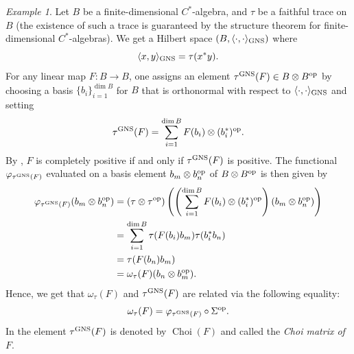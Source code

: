 \documentclass[11pt, a4paper, oneside, final, reqno]{amsart}
\newcommand{\Choi}{\operatorname{Choi}}
\theoremstyle{definition}
\theoremstyle{plain}
\theoremstyle{remark}
\newtheorem{example}[definition]{Example}
\numberwithin{equation}{section}
\begin{document}
\begin{example}\label{example:finite-dimensional Choi matrix}
    Let $B$ be a finite-dimensional $C^*$-algebra, and $\tau$ be a faithful trace on $B$ (the existence of such a trace is guaranteed by the structure theorem for finite-dimensional $C^*$-algebras). We get a Hilbert space $(B, \langle \cdot, \cdot \rangle_{\rm GNS})$ where
    \begin{equation*}
        \langle x, y \rangle_{\rm GNS} = \tau(x^*y).
    \end{equation*}
    For any linear
    map $F \colon B \to B$, one assigns an element $\tau^{\rm GNS}(F) \in B \otimes B^{\rm op}$ by choosing a basis $\{b_i\}_{i = 1}^{\dim B}$ for $B$ that is orthonormal with respect to $\langle \cdot, \cdot \rangle_{\rm GNS}$ and setting
    \begin{equation*}
        \tau^{\rm GNS}(F) = \sum_{i = 1}^{\dim B} F(b_i) \otimes (b_i^*)^{\rm op}.
    \end{equation*}
    By \cite[Proposition 3.7]{Wasilewski2024}, $F$ is completely positive if and only if $\tau^{\rm GNS}(F)$ is positive. The functional $\varphi_{\tau^{\rm GNS}(F)}$ evaluated on a basis element $b_m \otimes b_n^{\rm op}$ of $B \otimes B^{\rm op}$ is then given by
    \begin{align*}
        \varphi_{\tau^{\rm GNS}(F)}(b_m \otimes b_n^{\rm op})
        & = (\tau \otimes \tau^{\rm op})\left(\left(\sum_{i = 1}^{\dim B} F(b_i) \otimes (b_i^*)^{\rm op}\right)(b_m \otimes b_n^{\rm op})\right) \\
        & = \sum_{i = 1}^{\dim B} \tau(F(b_i)b_m)\tau(b_i^*b_n) \\
        & = \tau(F(b_n)b_m) \\
        & = \omega_\tau(F)(b_n \otimes b_m^{\rm op}).
    \end{align*}
    Hence, we get that $\omega_\tau(F)$ and $\tau^{\rm GNS}(F)$ are related via the following equality:
    \begin{equation*}
        \omega_\tau(F) = \varphi_{\tau^{\rm GNS}(F)} \circ \Sigma^{\rm op}.
    \end{equation*}
    In \cite{CourtneyGanesanWasilewski25} the element $\tau^{\rm GNS}(F)$ is denoted by $\Choi(F)$ and called the \emph{Choi matrix of $F$}.
\end{example}

\medskip
\end{document}
